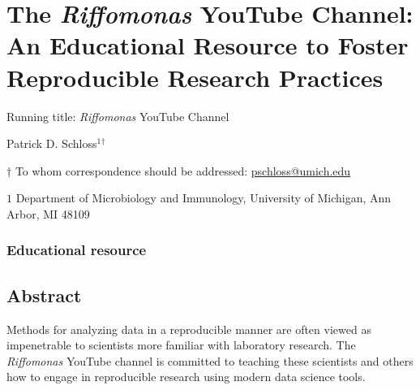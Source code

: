 \documentclass[
]{article}
\author{}
\date{\vspace{-2.5em}}
\begin{document}
\vspace*{10mm}

\hypertarget{the-riffomonas-youtube-channel-an-educational-resource-to-foster-reproducible-research-practices}{%
\section{\texorpdfstring{The \emph{Riffomonas} YouTube Channel: An
Educational Resource to Foster Reproducible Research
Practices}{The Riffomonas YouTube Channel: An Educational Resource to Foster Reproducible Research Practices}}\label{the-riffomonas-youtube-channel-an-educational-resource-to-foster-reproducible-research-practices}}

\vspace{15mm}

Running title: \emph{Riffomonas} YouTube Channel

\vspace{15mm}

Patrick D. Schloss\({^1}\)\({^\dagger}\)

\vspace{40mm}

\(\dagger\) To whom correspondence should be addressed:
\href{mailto:pschloss@umich.edu}{pschloss@umich.edu}

\(1\) Department of Microbiology and Immunology, University of Michigan,
Ann Arbor, MI 48109

\vspace{35mm}

\hypertarget{educational-resource}{%
\subsubsection{Educational resource}\label{educational-resource}}

\newpage
\linenumbers

\hypertarget{abstract}{%
\subsection{Abstract}\label{abstract}}

Methods for analyzing data in a reproducible manner are often viewed as
impenetrable to scientists more familiar with laboratory research. The
\emph{Riffomonas} YouTube channel is committed to teaching these
scientists and others how to engage in reproducible research using
modern data science tools.

\newpage
\end{document}
